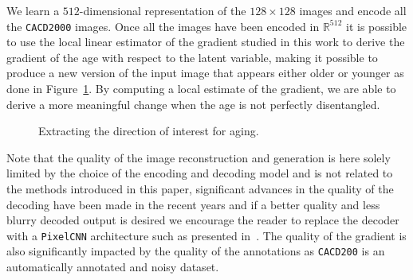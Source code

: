 We learn a $512$-dimensional representation of the $128\times 128$ images and encode all the \texttt{CACD2000} images.
Once all the images have been encoded in $\mathbb{R}^{512}$ it is possible to use the local linear estimator of the gradient studied in this work to derive the gradient of the age with respect to the latent variable, making it possible to produce a new version of the input image that appears either older or younger as done in Figure~\ref{fig:age}. By computing a local estimate of the gradient, we are able to derive a more meaningful change when the age is not perfectly disentangled.
\begin{figure}[H]
    \centering
    \caption{Extracting the direction of interest for aging.}\label{fig:age}
\end{figure}
Note that the quality of the image reconstruction and generation is here solely limited by the choice of the encoding and decoding model and is not related to the methods introduced in this paper, significant advances in the quality of the decoding have been made in the recent years and if a better quality and less blurry decoded output is desired we encourage the reader to replace the decoder with a \texttt{PixelCNN} architecture such as presented in~\cite{salimansPixelCNNImprovingPixelCNN2017}. The quality of the gradient is also significantly impacted by the quality of the annotations as \texttt{CACD200} is an automatically annotated and noisy dataset. 

